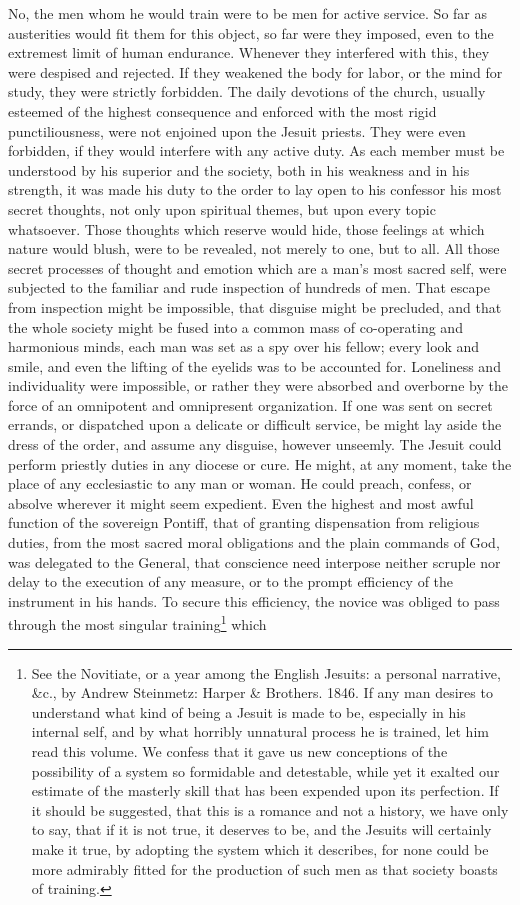 \documentclass[]{book}
\let\rmarkdownfootnote\footnote%
\def\footnote{\protect\rmarkdownfootnote}
\begin{document}
No, the men whom he would train were to be men for active service. So far as austerities would fit them for this object, so far were they imposed, even to the extremest limit of human endurance. Whenever they interfered with this, they were despised and rejected. If they weakened the body for labor, or the mind for study, they were strictly forbidden. The daily devotions of the church, usually esteemed of the highest consequence and enforced with the most rigid punctiliousness, were not enjoined upon the Jesuit priests. They were even forbidden, if they would interfere with any active duty. As each member must be understood by his superior and the society, both in his weakness and in his strength, it was made his duty to the order to lay open to his confessor his most secret thoughts, not only upon spiritual themes, but upon every topic whatsoever. Those thoughts which reserve would hide, those feelings at which nature would blush, were to be revealed, not merely to one, but to all. All those secret processes of thought and emotion which are a man's most sacred self, were subjected to the familiar and rude inspection of hundreds of men. That escape from inspection might be impossible, that disguise might be precluded, and that the whole society might be fused into a common mass of co-operating and harmonious minds, each man was set as a spy over his fellow; every look and smile, and even the lifting of the eyelids was to be accounted for. Loneliness and individuality were impossible, or rather they were absorbed and overborne by the force of an omnipotent and omnipresent organization. If one was sent on secret errands, or dispatched upon a delicate or difficult service, be might lay aside the dress of the order, and assume any disguise, however unseemly. The Jesuit could perform priestly duties in any diocese or cure. He might, at any moment, take the place of any ecclesiastic to any man or woman. He could preach, confess, or absolve wherever it might seem expedient. Even the highest and most awful function of the sovereign Pontiff, that of granting dispensation from religious duties, from the most sacred moral obligations and the plain commands of God, was delegated to the General, that conscience need interpose neither scruple nor delay to the execution of any measure, or to the prompt efficiency of the instrument in his hands. To secure this efficiency, the novice was obliged to pass through the most singular training\footnote{See the Novitiate, or a year among the English Jesuits: a personal narrative, \&c., by Andrew Steinmetz: Harper \& Brothers. 1846. If any man desires to understand what kind of being a Jesuit is made to be, especially in his internal self, and by what horribly unnatural process he is trained, let him read this volume. We confess that it gave us new conceptions of the possibility of a system so formidable and detestable, while yet it exalted our estimate of the masterly skill that has been expended upon its perfection. If it should be suggested, that this is a romance and not a history, we have only to say, that if it is not true, it deserves to be, and the Jesuits will certainly make it true, by adopting the system which it describes, for none could be more admirably fitted for the production of such men as that society boasts of training.} which 
\end{document}
